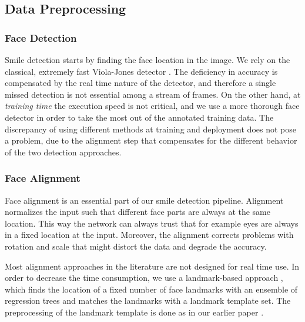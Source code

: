 \documentclass[conference]{IEEEtran}
\begin{document}
\subsection{Data Preprocessing}

\subsubsection{Face Detection}

 
Smile detection starts by finding the face location in the image. We rely on the classical, extremely fast Viola-Jones detector \cite{viola}. The deficiency in accuracy is compensated by the real time nature of the detector, and therefore a single missed detection is not essential among a stream of frames. On the other hand, at \textit{training time} the execution speed is not critical, and we use a more thorough face detector \cite{headhunter} in order to take the most out of the annotated training data. The discrepancy of using different methods at training and deployment does not pose a problem, due to the alignment step that compensates for the different behavior of the two detection approaches.

\subsubsection{Face Alignment}

Face alignment is an essential part of our smile detection pipeline. Alignment normalizes the input such that different face parts are always at the same location. This way the network can always trust that for example eyes are always in a fixed location at the input. Moreover, the alignment corrects problems with rotation and scale that might distort the data and degrade the accuracy.

Most alignment approaches in the literature are not designed for real time use. In order to decrease the time consumption, we use a landmark-based approach \cite{dlip}, which finds the location of a fixed number of face landmarks with an ensemble of regression trees and matches the landmarks with a landmark  template set. The preprocessing of the landmark template is done as in our earlier paper \cite{bai2018}.
\end{document}
